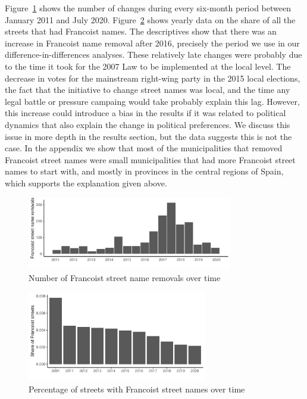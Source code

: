\documentclass[12pt, notitlepage]{article}
\begin{document}
Figure~\ref{fig:changes_time} shows the number of changes during every six-month period between January 2011 and July 2020.
Figure~\ref{fig:fs_year} shows yearly data on the share of all the streets that had Francoist names.
The descriptives show that there was an increase in Francoist name removal after 2016, precisely the period we use in our difference-in-differences analyses.
These relatively late changes were probably due to the time it took for the 2007 Law to be implemented at the local level.
The decrease in votes for the mainstream right-wing party in the 2015 local elections, the fact that the initiative to change street names was local, and the time any legal battle or pressure campaing would take probably explain this lag.
However, this increase could introduce a bias in the results if it was related to political dynamics that also explain the change in political preferences.
We discuss this issue in more depth in the results section, but the data suggests this is not the case.
In the appendix we show that most of the municipalities that removed Francoist street names were small municipalities that had more Francoist street names to start with, and mostly in provinces in the central regions of Spain, which supports the explanation given above.

\begin{figure}[htb!]
\centering

  \includegraphics[width = 0.8\textwidth]{img/changes_over_time}

  \caption{Number of Francoist street name removals over time}\label{fig:changes_time}

\end{figure}

\begin{figure}[htb!]
\centering

  \includegraphics[width = 0.7\textwidth]{img/fs_year}

  \caption{Percentage of streets with Francoist street names over time}\label{fig:fs_year}

\end{figure}
\end{document}
